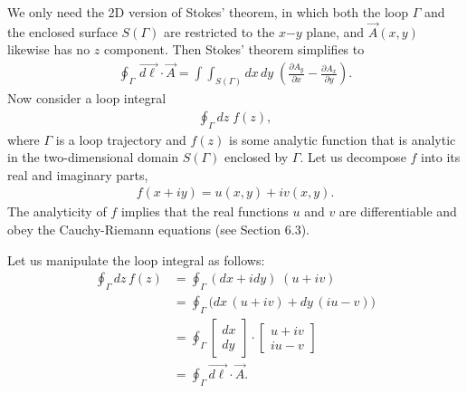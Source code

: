 \documentclass[10pt,a4paper]{article}
\begin{document}
We only need the 2D version of Stokes' theorem, in which both the loop
$\Gamma$ and the enclosed surface $S(\Gamma)$ are restricted to the
$x\mathrm{-}y$ plane, and $\vec{A}(x,y)$ likewise has no $z$
component.  Then Stokes' theorem simplifies to
\begin{align}
  \oint_\Gamma\, \vec{d\ell} \cdot \vec{A} = \int\!\!\!\int_{S(\Gamma)}\! dx \,dy \; \left(\frac{\partial A_y}{\partial x} - \frac{\partial A_x}{\partial y}\right).
\end{align}
Now consider a loop integral
\begin{align*}
  \oint_\Gamma dz \; f(z),
\end{align*}
where $\Gamma$ is a loop trajectory and $f(z)$ is some analytic
function that is analytic in the two-dimensional domain $S(\Gamma)$
enclosed by $\Gamma$. Let us decompose $f$ into its real and imaginary
parts,
\begin{align}
  f(x+iy) = u(x,y) + iv(x,y).
\end{align}
The analyticity of $f$ implies that the real functions $u$ and $v$ are
differentiable and obey the Cauchy-Riemann equations (see Section
6.3).

Let us manipulate the loop integral as follows:
\begin{align}
  \oint_\Gamma dz \, f(z) &= \oint_\Gamma \left(dx + i dy\right) \; \left(u + i v\right) \\
  &= \oint_\Gamma \Bigg(dx\, (u+iv) + dy\, (iu - v) \Bigg)  \\
  &= \oint_\Gamma \begin{bmatrix}dx\\dy\end{bmatrix} \cdot \begin{bmatrix}u + i v \\ iu - v\end{bmatrix}\\
      &= \oint_\Gamma \vec{d\ell} \cdot \vec{A}.
\end{align}
\end{document}
